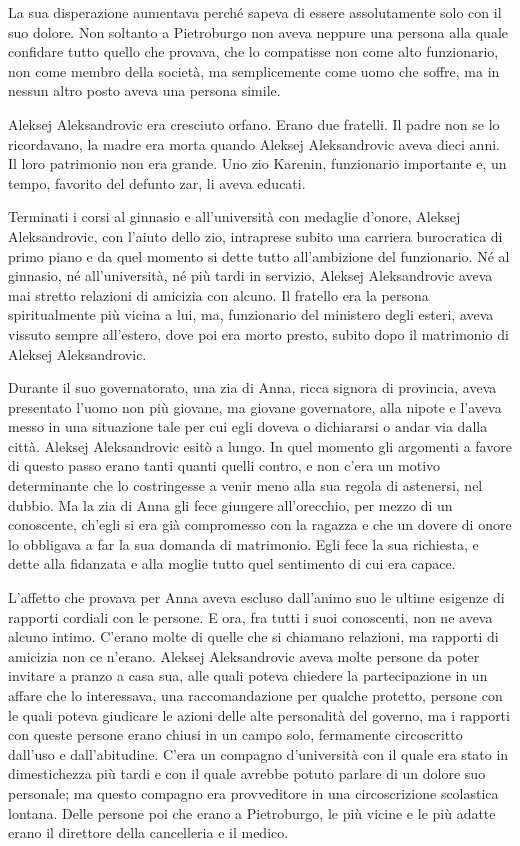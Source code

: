 La sua disperazione aumentava perché sapeva di essere assolutamente solo con il suo dolore. Non soltanto a Pietroburgo non aveva neppure una persona alla quale confidare tutto quello che provava, che lo compatisse non come alto funzionario, non come membro della società, ma semplicemente come uomo che soffre, ma in nessun altro posto aveva una persona simile. 

Aleksej Aleksandrovic era cresciuto orfano. Erano due fratelli. Il padre non se lo ricordavano, la madre era morta quando Aleksej Aleksandrovic aveva dieci anni. Il loro patrimonio non era grande. Uno zio Karenin, funzionario importante e, un tempo, favorito del defunto zar, li aveva educati. 

Terminati i corsi al ginnasio e all'università con medaglie d'onore, Aleksej Aleksandrovic, con l'aiuto dello zio, intraprese subito una carriera burocratica di primo piano e da quel momento si dette tutto all'ambizione del funzionario. Né al ginnasio, né all'università, né più tardi in servizio, Aleksej Aleksandrovic aveva mai stretto relazioni di amicizia con alcuno. Il fratello era la persona spiritualmente più vicina a lui, ma, funzionario del ministero degli esteri, aveva vissuto sempre all'estero, dove poi era morto presto, subito dopo il matrimonio di Aleksej Aleksandrovic. 

Durante il suo governatorato, una zia di Anna, ricca signora di provincia, aveva presentato l'uomo non più giovane, ma giovane governatore, alla nipote e l'aveva messo in una situazione tale per cui egli doveva o dichiararsi o andar via dalla città. Aleksej Aleksandrovic esitò a lungo. In quel momento gli argomenti a favore di questo passo erano tanti quanti quelli contro, e non c'era un motivo determinante che lo costringesse a venir meno alla sua regola di astenersi, nel dubbio. Ma la zia di Anna gli fece giungere all'orecchio, per mezzo di un conoscente, ch'egli si era già compromesso con la ragazza e che un dovere di onore lo obbligava a far la sua domanda di matrimonio. Egli fece la sua richiesta, e dette alla fidanzata e alla moglie tutto quel sentimento di cui era capace. 

L'affetto che provava per Anna aveva escluso dall'animo suo le ultime esigenze di rapporti cordiali con le persone. E ora, fra tutti i suoi conoscenti, non ne aveva alcuno intimo. C'erano molte di quelle che si chiamano relazioni, ma rapporti di amicizia non ce n'erano. Aleksej Aleksandrovic aveva molte persone da poter invitare a pranzo a casa sua, alle quali poteva chiedere la partecipazione in un affare che lo interessava, una raccomandazione per qualche protetto, persone con le quali poteva giudicare le azioni delle alte personalità del governo, ma i rapporti con queste persone erano chiusi in un campo solo, fermamente circoscritto dall'uso e dall'abitudine. C'era un compagno d'università con il quale era stato in dimestichezza più tardi e con il quale avrebbe potuto parlare di un dolore suo personale; ma questo compagno era provveditore in una circoscrizione scolastica lontana. Delle persone poi che erano a Pietroburgo, le più vicine e le più adatte erano il direttore della cancelleria e il medico. 

